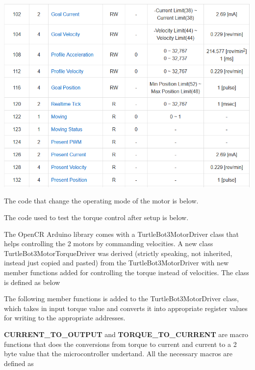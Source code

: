 \documentclass[12]{article}
\begin{document}
\begin{center}
	\includegraphics[width=\linewidth]{images/dxl_control_table.png}\\
\end{center}

The code that change the operating mode of the motor is below. 



The code used to test the torque control after setup is below. 


The OpenCR Arduino library comes with a TurtleBot3MotorDriver class that helps controlling the 2 motors by commanding velocities. 
A new class TurtleBot3MotorTorqueDriver was derived (strictly speaking, not inherited, instead just copied and pasted) from the TurtleBot3MotorDriver with new member functions added for controlling the torque instead of velocities. 
The class is defined as below


The following member functions is added to the TurtleBot3MotorDriver class, which takes in input torque value and converts it into appropriate register values for writing to the appropriate addresses.


\textbf{CURRENT\_TO\_OUTPUT} and \textbf{TORQUE\_TO\_CURRENT} are macro functions that does the conversions from torque to current and current to a 2 byte value that the microcontroller undertand. 
All the necessary macros are defined as

\end{document}

